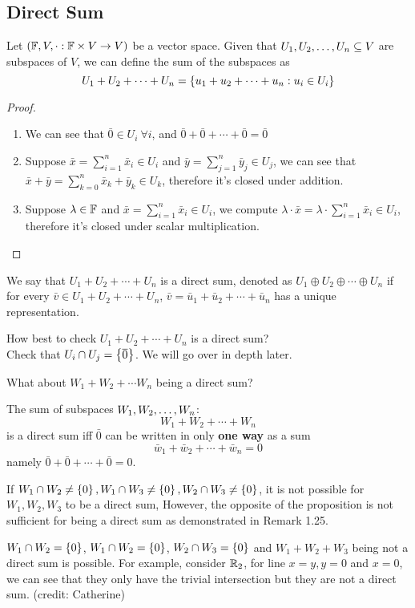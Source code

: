 \subsection{Direct Sum}
\begin{definition}
    Let $(\mathbb F, V, \cdot : \mathbb F \times V \to V)$ be a vector space. Given that ${U}_1,{U}_2, \ldots, {U}_{n} \subseteq V$ are subspaces of $V$, we can define the sum of the subspaces as 
    \[ U_1 + U_2 + \cdots + U_n = \left\{ u_1 + u_2 + \cdots + u_n : u_i \in U_i \right\} \]
\end{definition}
\begin{proof}
    \begin{enumerate} [label  = \arabic*)]
        \item We can see that $\bar 0 \in U_i \ \forall i$, and $\bar 0 + \bar 0 + \cdots + \bar 0 = \bar 0$
        \item Suppose $\bar x = \sum_{i = 1}^n \bar x_i \in U_i$ and $\bar  y = \sum_{j = 1}^n \bar y_j \in U_j$, we can see that $\bar x + \bar y = \sum_{k = 0}^n \bar x_k + \bar y_k \in U_k$, therefore it's closed under addition.
        \item Suppose $\lambda \in \mathbb F$ and $\bar x = \sum_{i = 1}^n \bar x_i \in U_i$, we compute $\lambda \cdot \bar x = \lambda \cdot \sum_{i = 1}^n \bar x_i \in U_i$, therefore it's closed under scalar multiplication.
    \end{enumerate}
\end{proof}
\begin{definition}
    We say that $U_1 + U_2 + \cdots + U_n$ is a direct sum, denoted as $U_1 \oplus U_2 \oplus \cdots \oplus U_n$ if for every $\bar v \in U_1 + U_2 + \cdots + U_n$, $\bar v = \bar u_1 + \bar u_2 + \cdots + \bar u_n$ has a unique representation. 
\end{definition} 
\begin{remark}
    How best to check $U_1 + U_2 + \cdots + U_n$ is a direct sum? \\
    Check that $U_i \cap U_j = \left\{ \overline 0 \right\}$. We will go over in depth later.
\end{remark}
What about $W_1 + W_2 + \cdots W_n$ being a direct sum?
\begin{theorem}
    The sum of subspaces ${W}_1,{W}_2, \ldots, {W}_{n}$: 
    \[W_1 + W_2 + \cdots + W_n\]
    is a direct sum iff $\bar 0$ can be written in only \textbf{one way} as a sum 
    \[ \bar w_1 + \bar w_2 + \cdots + \bar w_n = 0\]
    namely $\bar 0 + \bar 0 + \cdots + \bar 0 = 0$.
\end{theorem}
\begin{remark}
    If $W_1 \cap W_2 \neq \left\{ 0 \right\}, W_1 \cap W_3 \neq \left\{ 0 \right\}, W_2 \cap W_3 \neq \left\{ 0 \right\}$, it is not possible for $W_1,W_2,W_3$ to be a direct sum, However, the opposite of the proposition is not sufficient for being a direct sum as demonstrated in Remark 1.25.
\end{remark}
\begin{remark}
    $W_1 \cap W_2 = \left\{ 0 \right\}$, $W_1 \cap W_2 = \left\{ 0 \right\}$, $W_2 \cap W_3 = \left\{ 0 \right\}$ and $W_1 + W_2 + W_3$ being not a direct sum is possible. For example, consider $\mathbb R_2$, for line $x = y, y = 0$ and $x = 0$, we can see that they only have the trivial intersection but they are not a direct sum. (credit: Catherine)
\end{remark}
\newpage 